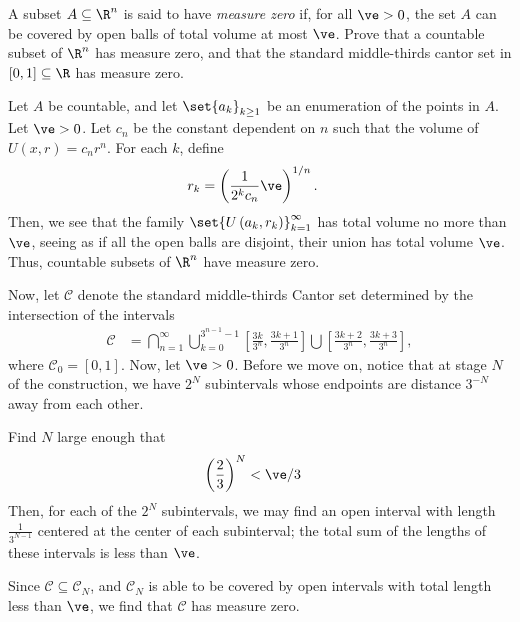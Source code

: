 \documentclass[10pt]{mypackage}
\begin{document}
\RaggedRight
\begin{problem}[Problem 1]
  A subset $A\subseteq \R^{n}$ is said to have \textit{measure zero} if, for all $\ve > 0$, the set $A$ can be covered by open balls of total volume at most $\ve$. Prove that a countable subset of $\R^{n}$ has measure zero, and that the standard middle-thirds cantor set in $[0,1]\subseteq \R$ has measure zero.
\end{problem}
\begin{solution}
  Let $A$ be countable, and let $\set{a_k}_{k\geq 1}$ be an enumeration of the points in $A$. Let $\ve > 0$. Let $c_{n}$ be the constant dependent on $n$ such that the volume of $U\left( x,r \right) = c_nr^{n}$. For each $k$, define
  \begin{align*}
    r_k &= \left( \frac{1}{2^{k}c_n} \ve \right)^{1/n}.
  \end{align*}
  Then, we see that the family $\set{U\left( a_k,r_k \right)}_{k=1}^{\infty}$ has total volume no more than $\ve$, seeing as if all the open balls are disjoint, their union has total volume $\ve$. Thus, countable subsets of $\R^{n}$ have measure zero.\newline

  Now, let $ \mathcal{C} $ denote the standard middle-thirds Cantor set determined by the intersection of the intervals
  \begin{align*}
    \mathcal{C} &= \bigcap_{n=1}^{\infty} \bigcup_{k=0}^{3^{n-1}-1} \left[ \frac{3k}{3^{n}},\frac{3k + 1}{3^{n}} \right] \bigcup \left[ \frac{3k + 2}{3^{n}} , \frac{3k + 3}{3^{n}} \right],
  \end{align*}
  where $\mathcal{C}_0 = \left[ 0,1 \right]$. Now, let $\ve > 0$. Before we move on, notice that at stage $N$ of the construction, we have $2^{N}$ subintervals whose endpoints are distance $3^{-N}$ away from each other.\newline

  Find $N$ large enough that
  \begin{align*}
    \left( \frac{2}{3} \right)^{N} &< \ve/3
  \end{align*}
  Then, for each of the $2^{N}$ subintervals, we may find an open interval with length $\frac{1}{3^{N-1}}$ centered at the center of each subinterval; the total sum of the lengths of these intervals is less than $\ve$.\newline

  Since $\mathcal{C}\subseteq \mathcal{C}_N$, and $\mathcal{C}_N$ is able to be covered by open intervals with total length less than $\ve$, we find that $\mathcal{C}$ has measure zero.
\end{solution}
\end{document}
